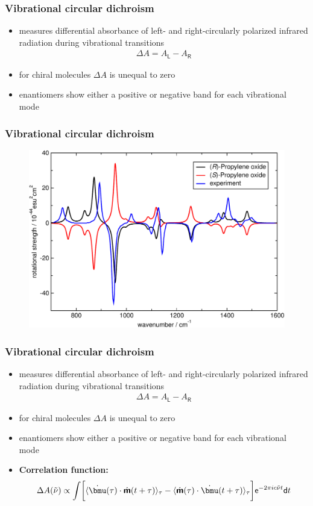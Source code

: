\documentclass[t]{beamer}
\begin{document}
\begin{frame}
	\frametitle{Vibrational circular dichroism}
	\begin{itemize}
		\item measures differential absorbance of left- and right-circularly polarized infrared radiation during vibrational transitions
		      \begin{align*}
			      \Delta A = A_\mathsf{L} - A_\mathsf{R}
		      \end{align*}
		\item for chiral molecules $\Delta A$ is unequal to zero
		\item enantiomers show either a positive or negative band for each vibrational mode
	\end{itemize}
\end{frame}
\begin{frame}
	\frametitle{Vibrational circular dichroism}
	\begin{figure}
		\includegraphics[width=.8\textwidth]{figures/PropOx_vcd.pdf}
	\end{figure}
\end{frame}
\begin{frame}
	\frametitle{Vibrational circular dichroism}
	\begin{itemize}
		\item measures differential absorbance of left- and right-circularly polarized infrared radiation during vibrational transitions
		      \begin{align*}
			      \Delta A = A_\mathsf{L} - A_\mathsf{R}
		      \end{align*}
		\item for chiral molecules $\Delta A$ is unequal to zero
		\item enantiomers show either a positive or negative band for each vibrational mode
		\item \textbf{Correlation function:}
		      \begin{align*}
			      \Delta A (\tilde{\nu}) \propto \int \biggl[\langle \dot{\bmu} (\tau) \cdot \dot{\boldsymbol{\mathsf{m}}} (t + \tau) \rangle_{\tau} - \langle \dot{\boldsymbol{\mathsf{m}}} (\tau) \cdot \dot{\bmu} (t + \tau) \rangle_{\tau} \biggl] \mathsf{e}^{-2\pi i c \tilde{\nu} t}\mathsf{d}t
		      \end{align*}
	\end{itemize}
\end{frame}
\end{document}
